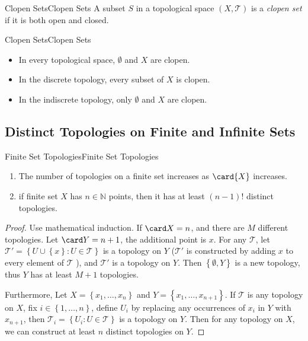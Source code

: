 \documentclass[../main.tex]{subfiles}
\begin{document}
\begin{definition}{Clopen Sets}{Clopen Sets}
A subset $S$ in a topological space $(X, \mathcal{T})$ is a \emph{clopen set} if it is both open and closed.
\end{definition}
\begin{example}{Clopen Sets}{Clopen Sets}
\begin{itemize}
\item In every topological space, $\emptyset$ and $X$ are clopen.
\item In the discrete topology, every subset of $X$ is clopen.
\item In the indiscrete topology, only $\emptyset$ and $X$ are clopen.
\end{itemize}
\end{example}

\subsection{Distinct Topologies on Finite and Infinite Sets}
\begin{proposition}{Finite Set Topologies}{Finite Set Topologies}
\begin{enumerate}
	\item The number of topologies on a finite set increases as $\card{X}$ increases.
	\item if finite set $X$ has $n\in \mathbb{N}$ points, then it has at least $(n-1)!$ distinct topologies.
\end{enumerate}
\end{proposition}
\begin{proof}
Use mathematical induction. If $\card X=n$, and there are $M$ different topologies. Let  $\card Y=n+1$, the additional point is $x$. For any $\mathcal{T}$, let $\mathcal{T}' = \left\{ U\cup \left\{ x \right\}: U\in \mathcal{T} \right\}$ is a topology on $Y$ ($\mathcal{T}'$ is constructed by adding $x$ to every element of $\mathcal{T}$ ), and $\mathcal{T}'$ is a topology on $Y$. Then $\left\{ \emptyset ,Y \right\}$ is a new topology, thus $Y$ has at least $M+1$ topologies.

Furthermore, Let $X = \left\{ x_1, \ldots ,x_n \right\}$ and $Y = \left\{ x_1, \ldots ,x_{n+1} \right\}$. If $\mathcal{T}$ is any topology on $X$, fix $i\in \left\{ 1, \ldots ,n \right\}$, define $U_i$ by replacing any occurrences of $x_i$ in $Y$ with $x_{n+1}$, then $\mathcal{T}_i = \left\{ U_i : U\in \mathcal{T} \right\}$ is a topology on $Y$. Then for any topology on $X$, we can construct at least $n$ distinct topologies on $Y$. 
\end{proof}
\end{document}
